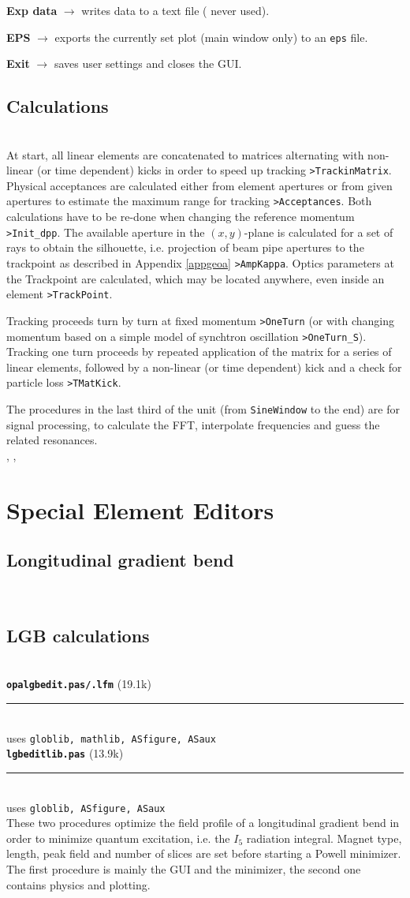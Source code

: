 \documentclass[12pt]{article}
\newcommand\code[1]{{\tt #1}}
\newcommand{\ofld}[1]{\colorbox{black!15}{{{\color{black}\bf #1}}}}
\newcommand\guico[1]{{\color{blue}\code{#1}}}
\newcommand{\evcod}[2]{\ofld{#1} $\rightarrow$ \guico{#2}}
\newcommand{\opagui}[1]{\colorbox{blue!20}{{\color{black}\code{#1}}}}
\newcommand{\oguih}[2]{\subsection{\label{#2}#1}{\Huge\opagui{#2}}\\}
\newcommand{\opauni}[1]{\colorbox{orange!30}{{\color{black}\code{#1}}}}
\newcommand{\ounih}[2]{\subsection{\label{#2}#1}{\Huge\opauni{#2}}\\}
\newcommand{\ouni}[1]{\hyperref[#1]{\opauni{#1}}}
\newcommand{\uses}[1]{\flushleft {\bf Uses:} #1}
\newcommand{\todo}[1]{{\color{red} #1}}
\newcommand\opamodule[3]{{\bf \tt #1} #2\\  \rule[3pt]{\textwidth}{0.2pt} \\ {\scriptsize uses \tt  #3}\\[1ex]}
\begin{document}
\evcod{Exp data}{butFileClick} writes data to a text file (\todo{never used}).

\evcod{EPS}{butPSClick} exports the currently set plot (main window only) to an \code{eps} file.

\evcod{Exit}{Exit} saves user settings and closes the GUI.




\ounih{Calculations}{tracklib}

At start, all linear elements are concatenated to matrices alternating with non-linear (or time dependent) kicks in order to speed up tracking \code{>TrackinMatrix}. Physical acceptances are calculated either from element apertures or from given apertures to estimate the maximum range for tracking \code{>Acceptances}. Both calculations have to be re-done when changing the reference momentum \code{>Init\_dpp}.
The available aperture in the $(x,y)$-plane is calculated for a set of rays to obtain the silhouette, i.e. projection of beam pipe apertures to the trackpoint as described in Appendix \ref{appgeoa} \code{>AmpKappa}. Optics parameters at the Trackpoint are calculated, which may be located anywhere, even inside an element \code{>TrackPoint}.

Tracking proceeds turn by turn at fixed momentum \code{>OneTurn} (or with changing momentum based on a simple model of synchtron oscillation \code{>OneTurn\_S}). Tracking one turn proceeds by repeated application of the matrix for a series of linear elements, followed by a non-linear (or time dependent) kick and a check for particle loss \code{>TMatKick}.

The procedures in the last third of the unit (from {\tt SineWindow} to the end) are for signal processing, to calculate the FFT, interpolate frequencies and guess the related resonances.\\


\uses{\ouni{linoplib}, \ouni{elemlib}, \ouni{globlib} \ouni{mathlib}}




\section{\label{secspee}Special Element Editors}


\oguih{Longitudinal gradient bend}{opalgbedit} 




\ounih{LGB calculations}{lgbeditlib} 



\opamodule{opalgbedit.pas/.lfm}{(19.1k)}{globlib,  mathlib, ASfigure, ASaux}
\opamodule{lgbeditlib.pas}{(13.9k)}{globlib, ASfigure, ASaux}
These two procedures optimize the field profile of a longitudinal gradient bend in order to minimize quantum excitation, i.e. the $I_5$ radiation integral. Magnet type, length, peak field and number of slices are set before starting a Powell minimizer. The first procedure is mainly the GUI and the minimizer, the second one contains physics and plotting.
\end{document}
